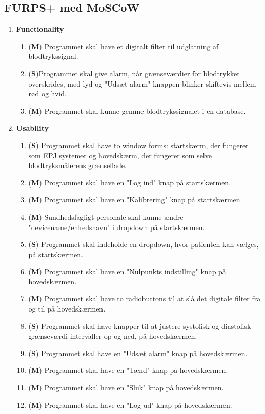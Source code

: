\subsection{FURPS+ med MoSCoW}
\begin{enumerate}
\item \textbf{Functionality}
\begin{enumerate}
\item (\textbf{M}) Programmet skal have et digitalt filter til udglatning af blodtrykssignal.
\item (\textbf{S})Programmet skal give alarm, når grænseværdier for blodtrykket overskrides, med lyd og "Udsæt alarm" knappen blinker skiftevis mellem rød og hvid.
\item (\textbf{M}) Programmet skal kunne gemme blodtrykssignalet i en database.
\end{enumerate}
\item \textbf{Usability}
\begin{enumerate}
\item (\textbf{S}) Programmet skal have to window forms: startskærm, der fungerer som  EPJ systemet og hovedskærm, der fungerer som selve blodtryksmålerens grænseflade.
\item (\textbf{M}) Programmet skal have en "Log ind" knap på startskærmen.
\item (\textbf{M}) Programmet skal have en "Kalibrering" knap på startskærmen.
\item (\textbf{M}) Sundhedsfagligt personale skal kunne ændre "devicename/enhedsnavn" i dropdown på startskærmen.
\item (\textbf{S}) Programmet skal indeholde en dropdown, hvor patienten kan vælges, på startskærmen.
\item (\textbf{M}) Programmet skal have en "Nulpunkts indstilling" knap på hovedskærmen.
\item (\textbf{M}) Programmet skal have to radiobuttons til at slå det digitale filter fra og til på hovedskærmen.
\item (\textbf{S}) Programmet skal have knapper til at justere systolisk og diastolisk grænseværdi-intervaller op og ned, på hovedskærmen.
\item (\textbf{S}) Programmet skal have en "Udsæt alarm" knap på hovedskærmen.
\item (\textbf{M}) Programmet skal have en "Tænd" knap på hovedskærmen.
\item (\textbf{M}) Programmet skal have en "Sluk" knap på hovedskærmen.
\item (\textbf{M}) Programmet skal have en "Log ud" knap på hovedskærmen.

\end{enumerate}
\end{enumerate}

